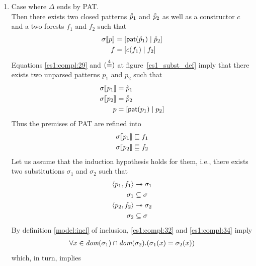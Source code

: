 \begin{enumerate}
\begin{enumerate}
    \end{enumerate}

  \item Case where \(\Delta\) ends by \textsf{PAT}.\\ Then there
    exists two closed patterns \(\close{p}_1\) and \(\close{p}_2\) as
    well as a constructor \(c\) and a two forests \(f_1\) and \(f_2\)
    such that
    \begin{align}
         \subst{{p}}{\sigma}
      &= \cons{\pat{\close{p}_1}}{\close{p}_2} \label{es1:compl:29}\\
         f
      &= \cons{c(f_1)}{f_2} \label{es1:compl:30}
    \end{align}
    Equations \eqref{es1:compl:29} and \((\eqn{4})\) at
    figure~\ref{es1_subst_def} imply that there exists two unparsed
    patterns \({p}_1\) and \({p}_2\) such that
    \begin{align*}
         \subst{{p}_1}{\sigma}
      &= \close{p}_1\\
         \subst{{p}_2}{\sigma}
      &= \close{p}_2\\
         {p}
      &= \cons{\pat{{p}_1}}{{p}_2}
    \end{align*}
    Thus the premises of \textsf{PAT} are refined into
    \begin{align*}
      \subst{{p}_1}{\sigma} &\sqsubseteq f_1\\
      \subst{{p}_2}{\sigma} &\sqsubseteq f_2
    \end{align*}
    Let us assume that the induction hypothesis holds for them, i.e.,
    there exists two substitutions \(\sigma_1\) and \(\sigma_2\) such
    that
    \begin{align}
       \smat{f_1}{{p}_1} &\twoheadrightarrow
       \sigma_1 \label{es1:compl:31}\\
       \sigma_1 &\subseteq \sigma \label{es1:compl:32}\\
       \smat{f_2}{{p}_2} &\twoheadrightarrow
       \sigma_2 \label{es1:compl:33}\\
       \sigma_2 &\subseteq \sigma \label{es1:compl:34}
    \end{align}
    By definition \eqref{model:incl} of inclusion,
    \eqref{es1:compl:32} and \eqref{es1:compl:34} imply
    \begin{gather}
      \forall x \in \dom{\sigma_1} \cap \dom{\sigma_2}.(\sigma_1(x) =
      \sigma_2(x))
    \end{gather}
    which, in turn, implies
    \begin{gather}

\end{gather}
\end{enumerate}
